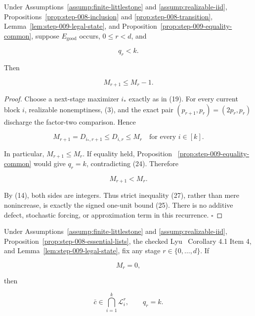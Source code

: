 \begin{proposition}\label{prop:step-009-unit-drop}
Under Assumptions~\ref{assump:finite-littlestone} and
\ref{assump:realizable-iid}, 
Propositions~\ref{prop:step-008-inclusion} and
\ref{prop:step-008-transition}, Lemma~\ref{lem:step-009-legal-state}, and
Proposition~\ref{prop:step-009-equality-common}, suppose
\(E_{\mathrm{good}}\) occurs, \(0\le r<d\), and

\[
 q_r<k.
 \tag{24}
\]

Then

\[
 M_{r+1}\le M_r-1.
 \tag{25}
\]


\end{proposition}

\begin{proof}
Choose a next-stage maximizer \(i_*\) exactly as in (19). For every
current block \(i\), realizable nonemptiness, (3), and the exact pair
\((p_{r+1},p_r)=(2p_r,p_r)\) discharge the factor-two comparison. Hence

\[
 M_{r+1}=D_{i_*,r+1}
 \le D_{i,r}
 \le M_r
 \quad\text{for every }i\in[k].
 \tag{26}
\]

In particular, \(M_{r+1}\le M_r\). If equality held, Proposition
~\ref{prop:step-009-equality-common} would give \(q_r=k\), contradicting
(24). Therefore

\[
 M_{r+1}<M_r.
 \tag{27}
\]

By (14), both sides are integers. Thus strict inequality (27), rather than
mere nonincrease, is exactly the signed one-unit bound (25). There is no
additive defect, stochastic forcing, or approximation term in this
recurrence. \(\square\)


\end{proof}

\begin{proposition}\label{prop:step-009-zero-support}
Under Assumptions~\ref{assump:finite-littlestone} and
\ref{assump:realizable-iid}, Proposition~\ref{prop:step-008-essential-lists}, the checked Lyu~\citep{lyu2025}
Corollary 4.1 Item 4, and Lemma~\ref{lem:step-009-legal-state}, fix any
stage \(r\in\{0,\ldots,d\}\). If

\[
 M_r=0,
 \tag{28}
\]

then

\[
 \bar c\in\bigcap_{i=1}^k\mathcal L_i^r,
 \qquad q_r=k.
 \tag{29}
\]


\end{proposition}

